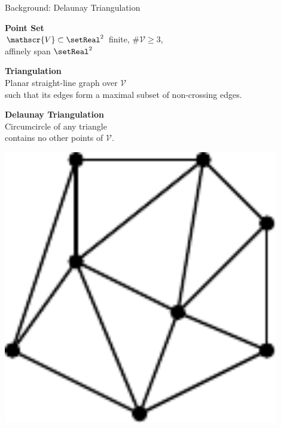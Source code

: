 \documentclass[aspectratio=169]{beamer}
\begin{document}
\begin{frame}{Background: Delaunay Triangulation}
  \begin{minipage}[c]{0.45\textwidth}
    \textbf{Point Set}\\
    $\mathscr{V}\subset\setReal^2$ finite, $\#\mathscr{V}\geq 3$, \\
    affinely span $\setReal^2$

    \bigskip

    \textbf{Triangulation}\\
    Planar straight-line graph over $\mathscr{V}$ \\
    such that its edges form a maximal subset of non-crossing edges.

    \bigskip

    \textbf{Delaunay Triangulation}\\
    Circumcircle of any triangle \\
    contains no other points of $\mathscr{V}$.
  \end{minipage}
  \hfill
  \begin{minipage}[c]{0.49\textwidth}
    \includegraphics[width=0.9\textwidth]{figures/delaunay-triangulation.pdf}
  \end{minipage}
\end{frame}
\end{document}
